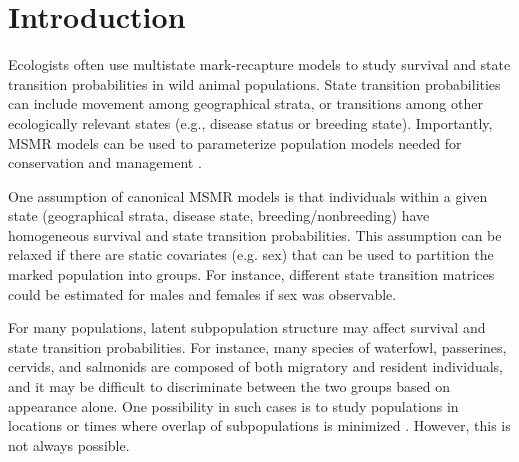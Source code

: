 \documentclass[times,mee,doublespace,]{besauth2}
\begin{document}

\maketitle \linenumbers

\def\VAR{{\rm Var}\,}
\def\COV{{\rm Cov}\,}
\def\Prob{{\rm P}\,}
\def\bfX{\bf X}
\def\bfbeta{\boldsymbol{\beta}}
\def\bfdelta{\boldsymbol{\delta}}
\def\bfeta{\boldsymbol{\eta}}
\def\bfphi{\pmb{\phi}}
\def\bftheta{\pmb{\theta}}
\def\bfpsi{\pmb{\psi}}
\def\bfPsi{\pmb{\Psi}}
\def\bfpi{\pmb{\pi}}
\def\bfp{{\bf p}}
\def\bfGamma{\pmb{\Gamma}}




\section{Introduction}

Ecologists often use multistate mark-recapture models \citep[hereafter, MSMR models][]{Hestbeck1991,Brownie1993,Schwarz1993} to study survival and state transition probabilities in wild animal populations.  State transition probabilities can include movement among geographical strata, or transitions among other ecologically relevant states (e.g., disease status or breeding state).  Importantly, MSMR models can be used to parameterize population models needed for conservation and management \citep{Nichols1992,Caswell2001}.

One assumption of canonical MSMR models is that individuals within a given state (geographical strata, disease state, breeding/nonbreeding) have homogeneous survival and state transition probabilities.  This assumption can be relaxed if there are static covariates (e.g. sex) that can be used to partition the marked population into groups.  For instance, different state transition matrices could be estimated for males and females if sex was observable.

For many populations, latent subpopulation structure may affect survival and state transition probabilities.  For instance, many species of waterfowl, passerines, cervids, and salmonids are composed of both migratory and resident individuals, and it may be difficult to discriminate between the two groups based on appearance alone. One possibility in such cases is to study populations in locations or times where overlap of subpopulations is minimized \citep[e.g. studying residents in the winter when migrants are not present][]{Hestbeck1991}.  However, this is not always possible.
\end{document}

